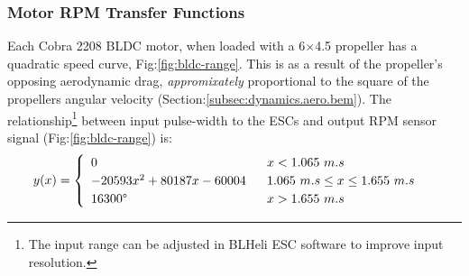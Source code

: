 \subsubsection*{Motor RPM Transfer Functions}
Each Cobra 2208 BLDC motor, when loaded with a 6$\times$4.5 propeller has a quadratic speed curve, Fig:\ref{fig:bldc-range}. This is as a result of the propeller's opposing aerodynamic drag, \emph{appromixately} proportional to the square of the propellers angular velocity (Section:\ref{subsec:dynamics.aero.bem}). The relationship\footnote{The input range can be adjusted in BLHeli ESC software to improve input resolution.} between input pulse-width to the ESCs and output RPM sensor signal (Fig:\ref{fig:bldc-range}) is:
\begin{equation}
y(x)=
\begin{cases}\begin{array}{ll}
0 & ~~x<1.065~m.s\\
-20593x^2 + 80187x - 60004 & ~~1.065~m.s \leq x \leq 1.655~m.s\\
16300\text{\textdegree} & ~~x>1.655~m.s\\
\end{array}
\end{cases}
\label{eq:bldc-range}
\end{equation}
\par
